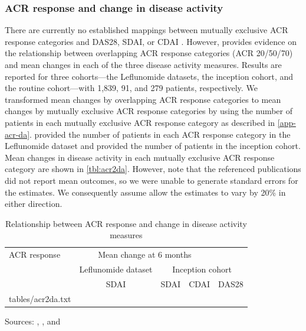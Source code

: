 \documentclass[11pt,final,fleqn]{article}
\makeatletter
\theoremstyle{plain}
\newcommand*\ExpandableInput[1]{\@@input#1 }
\makeatother
\begin{document}
\subsubsection{ACR response and change in disease activity}
There are currently no established mappings between mutually exclusive ACR response categories and DAS28, SDAI, or CDAI \citep{madan2015consensus}. However, \citet{aletaha2005simplified} provides evidence on the relationship between overlapping ACR response categories (ACR 20/50/70) and mean changes in each of the three disease activity measures. Results are reported for three cohorts---the Leflunomide datasets, the inception cohort, and the routine cohort---with 1,839, 91, and 279 patients, respectively. We transformed mean changes by overlapping ACR response categories to mean changes by mutually exclusive ACR response categories by using the number of patients in each mutually exclusive ACR response category as described in \autoref{app-acr-da}. \citet{smolen2003simplified} provided the number of patients in each ACR response category in the Leflunomide dataset and \citet{aletaha2005acute} provided the number of patients in the inception cohort. Mean changes in disease activity in each mutually exclusive ACR response category are shown in \autoref{tbl:acr2da}. However, note that the referenced publications did not report mean outcomes, so we were unable to generate standard errors for the estimates. We consequently assume allow the estimates to vary by 20\% in either direction.  


\begin{table}[!ht]
\begin{center}
\begin{threeparttable}
\caption{Relationship between ACR response and change in disease activity measures} \label{tbl:acr2da}
\begin{tabularx}{\textwidth}{@{\extracolsep{\fill}}lcccc}
\hline
\multicolumn{1}{l}{ACR response} &  \multicolumn{3}{c}{Mean change at 6 months}\\
\cmidrule{2-5}
\multicolumn{1}{l}{} & \multicolumn{1}{c}{Leflunomide dataset} & \multicolumn{3}{c}{Inception cohort}\\
\cmidrule(lr){2-2}  \cmidrule(lr){3-5}
\multicolumn{1}{c}{} & \multicolumn{1}{c}{SDAI} & \multicolumn{1}{c}{SDAI} &\multicolumn{1}{c}{CDAI} & \multicolumn{1}{c}{DAS28} \\
\hline
\ExpandableInput{tables/acr2da.txt}
\hline
\end{tabularx}
\scriptsize
Sources: \citet{aletaha2005simplified}, \citet{smolen2003simplified}, and  \citet{aletaha2005acute} 
\end{threeparttable}
\end{center}
\end{table}
\end{document}
